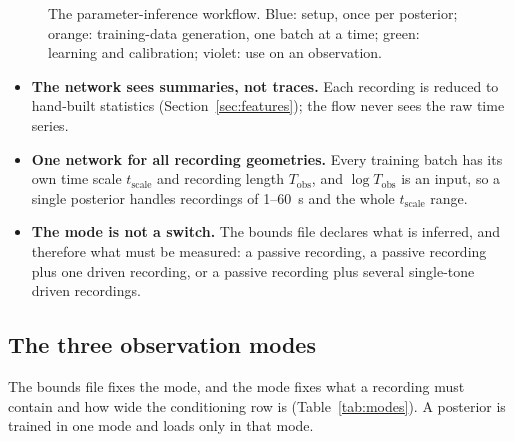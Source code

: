 \documentclass[10pt,a4paper]{article}
\newcommand{\Tobs}{T_{\mathrm{obs}}}
\newcommand{\tscale}{t_{\mathrm{scale}}}
\begin{document}
\begin{figure}[t]
\caption{The parameter-inference workflow. Blue: setup, once per posterior; orange: training-data generation, one
batch at a time; green: learning and calibration; violet: use on an observation.}
\label{fig:overview}
\end{figure}

\begin{keybox}[title={Three design decisions that shape everything below}]
\begin{itemize}
  \item \textbf{The network sees summaries, not traces.} Each recording is reduced to hand-built statistics
        (Section~\ref{sec:features}); the flow never sees the raw time series.
  \item \textbf{One network for all recording geometries.} Every training batch has its own time scale
        $\tscale$ and recording length $\Tobs$, and $\log\Tobs$ is an input, so a single posterior handles
        recordings of 1--60~s and the whole $\tscale$ range.
  \item \textbf{The mode is not a switch.} The bounds file declares what is inferred, and therefore what must be
        measured: a passive recording, a passive recording plus one driven recording, or a passive recording plus
        several single-tone driven recordings.
\end{itemize}
\end{keybox}

\subsection{The three observation modes}

The bounds file fixes the mode, and the mode fixes what a recording must contain and how wide the conditioning row is
(Table~\ref{tab:modes}). A posterior is trained in one mode and loads only in that mode.
\end{document}
